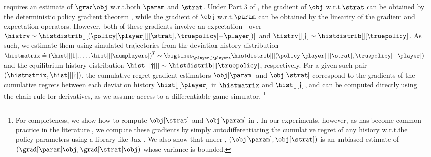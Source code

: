 



 requires an estimate of $\grad \obj$ w.r.t.\@ both $\param$ and $\strat$.
Under Part 3 of , the gradient of $\obj$ w.r.t.\@ $\strat$ can be obtained by the deterministic policy gradient theorem \citep{silver2014deterministic}, while the gradient of $\obj$ w.r.t.\@ $\param$ can be obtained by the linearity of the gradient and expectation operators.
However, both of these gradients involve an expectation---over $\histrv \sim \histdistrib[][{(\policy[\player][][\strat], \truepolicy[-\player])}]$ and $\histrv[][\dagger] \sim \histdistrib[][\truepolicy]$.
As such, we estimate them using simulated trajectories from the deviation 
history distribution $\histmatrix \doteq \left(\hist[][1], \hdots, \hist[][\numplayers]\right)^T \sim \bigtimes_{\player \in \players} \histdistrib[][{(\policy[\player][][\strat], \truepolicy[-\player])}]$  and 
the equilibrium history distribution $\hist[][\dagger][] \sim \histdistrib[][\truepolicy]$, respectively.
For a given such pair $(\histmatrix, \hist[][\dagger])$, the cumulative regret gradient estimators $\obj[\param]$ and $\obj[\strat]$ correspond to the gradients 
of the cumulative regrets between each deviation history $\hist[][\player]$ in $\histmatrix$ and $\hist[][\dagger]$, and can be computed directly using the chain rule for derivatives, as we assume access to a differentiable game simulator.%
\footnote{For completeness, we show how to compute $\obj[\strat]$ and $\obj[\param]$ in .
In our experiments, however, as has become common practice in the literature \citep{mora2021pods}, we compute these gradients by simply autodifferentiating the cumulative regret of any history w.r.t.\@ the policy parameters using a library like Jax \citep{jax2018github}. 
We also show that under , $(\obj[\param], \obj[\strat])$ is an unbiased estimate of $(\grad[\param]  \obj, \grad[\strat] \obj)$ whose variance is bounded.    }

